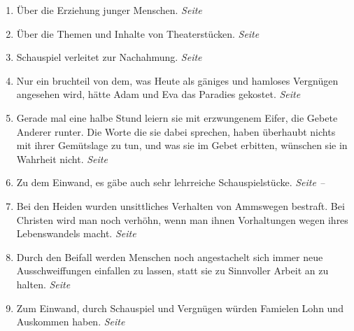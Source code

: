 \begin{enumerate}
 \item Über die Erziehung junger Menschen.
 \dotfill \textit{Seite \pageref{ref:17_01_erziehung}}\\

 \item Über die Themen und Inhalte von Theaterstücken.
 \dotfill \textit{Seite \pageref{ref:17_01_schauspiel}}\\

 \item Schauspiel verleitet zur Nachahmung.
 \dotfill \textit{Seite \pageref{ref:17_01_schauspiel_2}}\\

 \item Nur ein bruchteil von dem, was Heute als gäniges und hamloses Vergnügen
angesehen wird, hätte Adam und Eva das Paradies gekostet.
 \dotfill \textit{Seite \pageref{ref:17_02_adam_und_eva}}\\

 \item Gerade mal eine halbe Stund leiern sie mit erzwungenem Eifer, die Gebete
Anderer runter. Die Worte die sie dabei sprechen, haben überhaubt nichts mit
ihrer Gemütslage zu tun, und was sie im Gebet erbitten, wünschen sie in Wahrheit
nicht.
 \dotfill \textit{Seite \pageref{ref:17_04_gottesdienst}}\\

 \item Zu dem Einwand, es gäbe auch sehr lehrreiche Schauspielstücke.
 \dotfill \textit{Seite \pageref{ref:17_07_einwand} --
\pageref{ref:17_07_einwand_ende}}\\

 \item Bei den Heiden wurden unsittliches Verhalten von Ammswegen bestraft. Bei
Christen wird man noch verhöhn, wenn man ihnen Vorhaltungen wegen ihres
Lebenswandels macht.
 \dotfill \textit{Seite \pageref{ref:17_08_sittenwaechter}}\\

 \item Durch den Beifall werden Menschen noch angestachelt sich immer neue
Ausschweiffungen einfallen zu lassen, statt sie zu Sinnvoller Arbeit an zu
halten.
 \dotfill \textit{Seite \pageref{ref:17_09_bedarf_wecken}}\\

 \item Zum Einwand, durch Schauspiel und Vergnügen würden Famielen Lohn und
Auskommen haben.
 \dotfill \textit{Seite \pageref{ref:17_10_einwand}}\\


\end{enumerate}
